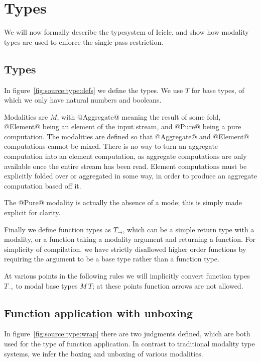 \section{Types}
\label{s:Types}

We will now formally describe the typesystem of Icicle, and show how modality types are used to enforce the single-pass restriction.



\subsection{Types}
In figure~\ref{fig:source:type:defs} we define the types.
We use $T$ for base types, of which we only have natural numbers and booleans.

Modalities are $M$, with @Aggregate@ meaning the result of some fold, @Element@ being an element of the input stream, and @Pure@ being a pure computation.
The modalities are defined so that @Aggregate@ and @Element@ computations cannot be mixed.
There is no way to turn an aggregate computation into an element computation, as aggregate computations are only available once the entire stream has been read.
Element computations must be explicitly folded over or aggregated in some way, in order to produce an aggregate computation based off it.

The @Pure@ modality is actually the absence of a mode; this is simply made explicit for clarity.


Finally we define function types as $T_\to$, which can be a simple return type with a modality, or a function taking a modality argument and returning a function.
For simplicity of compilation, we have strictly disallowed higher order functions by requiring the argument to be a base type rather than a function type.

At various points in the following rules we will implicitly convert function types $T_\to$ to modal base types $M~T$; at these points function arrows are not allowed.



\subsection{Function application with unboxing}
In figure~\ref{fig:source:type:wrap} there are two judgments defined, which are both used for the type of function application.
In contrast to traditional modality type systems, we infer the boxing and unboxing of various modalities.

